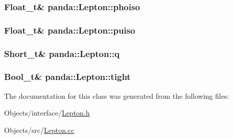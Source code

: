 \label{classpanda_1_1Lepton_a617664cd1e7e3cec69842363cfcaca0c}
\hypertarget{classpanda_1_1Lepton_afb1e1e5df37ead323e9fbe8b60f66370}{
\subsubsection[{phoiso}]{\setlength{\rightskip}{0pt plus 5cm}Float\_\-t\& {\bf panda::Lepton::phoiso}}}
\label{classpanda_1_1Lepton_afb1e1e5df37ead323e9fbe8b60f66370}
\hypertarget{classpanda_1_1Lepton_a8fd3e4abbeec0cdd9ab5236c9e4f0ac3}{
\subsubsection[{puiso}]{\setlength{\rightskip}{0pt plus 5cm}Float\_\-t\& {\bf panda::Lepton::puiso}}}
\label{classpanda_1_1Lepton_a8fd3e4abbeec0cdd9ab5236c9e4f0ac3}
\hypertarget{classpanda_1_1Lepton_aac3f4bc13824746a5bbf7e5a7ad7694d}{
\subsubsection[{q}]{\setlength{\rightskip}{0pt plus 5cm}Short\_\-t\& {\bf panda::Lepton::q}}}
\label{classpanda_1_1Lepton_aac3f4bc13824746a5bbf7e5a7ad7694d}
\hypertarget{classpanda_1_1Lepton_af6b18c84138266fa6696b3e599316ba9}{
\subsubsection[{tight}]{\setlength{\rightskip}{0pt plus 5cm}Bool\_\-t\& {\bf panda::Lepton::tight}}}
\label{classpanda_1_1Lepton_af6b18c84138266fa6696b3e599316ba9}


The documentation for this class was generated from the following files:\begin{DoxyCompactItemize}
\item 
Objects/interface/\hyperlink{Lepton_8h}{Lepton.h}\item 
Objects/src/\hyperlink{Lepton_8cc}{Lepton.cc}\end{DoxyCompactItemize}
